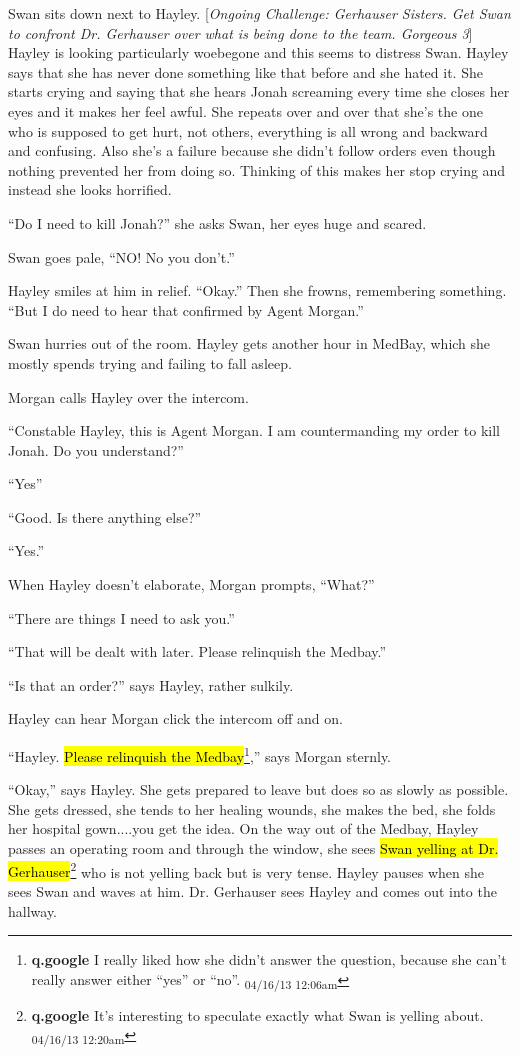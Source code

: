 Swan sits down next to Hayley.   {[}\textit{Ongoing Challenge: Gerhauser Sisters.  Get Swan to confront Dr. Gerhauser over what is being done to the team.  Gorgeous 3}{]}  Hayley is looking particularly woebegone and this seems to distress Swan.  Hayley says that she has never done something like that before and she hated it.  She starts crying and saying that she hears Jonah screaming every time she closes her eyes and it makes her feel awful.  She repeats over and over that she's the one who is supposed to get hurt, not others, everything is all wrong and backward and confusing.  Also she's a failure because she didn't follow orders even though nothing prevented her from doing so.  Thinking of this makes her stop crying and instead she looks horrified.

``Do I need to kill Jonah?'' she asks Swan, her eyes huge and scared.

Swan goes pale, ``NO!  No you don't.''

Hayley smiles at him in relief. ``Okay.''  Then she frowns, remembering something. ``But I do need to hear that confirmed by Agent Morgan.''

Swan hurries out of the room.  Hayley gets another hour in MedBay, which she mostly spends trying and failing to fall asleep.



Morgan calls Hayley over the intercom.

``Constable Hayley, this is Agent Morgan.  I am countermanding my order to kill Jonah.  Do you understand?''

``Yes''

``Good.  Is there anything else?''

``Yes.''

When Hayley doesn't elaborate, Morgan prompts, ``What?''

``There are things I need to ask you.''

``That will be dealt with later.  Please relinquish the Medbay.''

``Is that an order?'' says Hayley, rather sulkily.

Hayley can hear Morgan click the intercom off and on.

``Hayley. \hl{Please relinquish the Medbay}\footnote{\textbf{q.google }I really liked how she didn't answer the question, because she can't really answer either ``yes'' or ``no''. \textsubscript{04/16/13 12:06am}},'' says Morgan sternly.

``Okay,'' says Hayley.  She gets prepared to leave but does so as slowly as possible.  She gets dressed, she tends to her healing wounds, she makes the bed, she folds her hospital gown....you get the idea.  On the way out of the Medbay, Hayley passes an operating room and through the window, she sees \hl{Swan yelling at Dr. Gerhauser}\footnote{\textbf{q.google }It's interesting to speculate exactly what Swan is yelling about. \textsubscript{04/16/13 12:20am}} who is not yelling back but is very tense.  Hayley pauses when she sees Swan and waves at him.  Dr. Gerhauser sees Hayley and comes out into the hallway.



